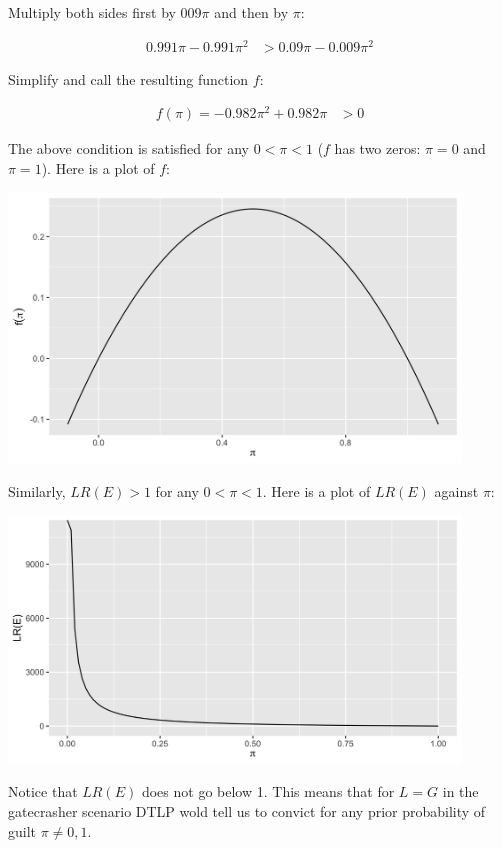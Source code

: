 \documentclass[10pt,dvipsnames,enabledeprecatedfontcommands]{scrartcl}
\begin{document}
\noindent Multiply both sides first by \(009\pi\) and then by \(\pi\):

\begin{align*}
 0.991\pi - 0.991\pi^2 &> 0.09\pi - 0.009\pi^2
 \end{align*}

\noindent Simplify and call the resulting function \(f\):

\begin{align*}
 f(\pi) = - 0.982 \pi^2 + 0.982\pi &>0 
 \end{align*}

\noindent The above condition is satisfied for any \(0<\pi <1\) (\(f\)
has two zeros: \(\pi = 0\) and \(\pi = 1\)). Here is a plot of \(f\):

\includegraphics[width=12cm]{f-gate.png}

Similarly, \(LR(E)>1\) for any \(0< \pi <1\). Here is a plot of
\(LR(E)\) against \(\pi\):

\includegraphics[width=12cm]{lre-gate.png}

\noindent Notice that \(LR(E)\) does not go below 1. This means that for
\(L=G\) in the gatecrasher scenario DTLP wold tell us to convict for any
prior probability of guilt \(\pi\neq 0,1\).
\end{document}
